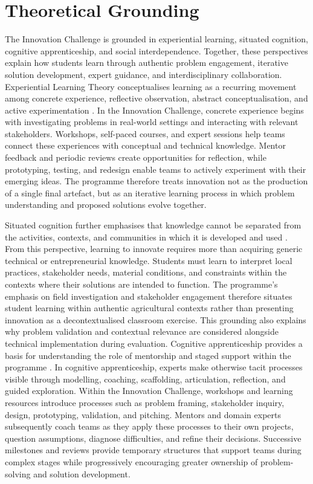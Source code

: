 \documentclass[runningheads]{llncs}
\begin{document}
\section{Theoretical Grounding}

The Innovation Challenge is grounded in experiential learning, situated cognition, cognitive apprenticeship, and social interdependence. Together, these perspectives explain how students learn through authentic problem engagement, iterative solution development, expert guidance, and interdisciplinary collaboration. Experiential Learning Theory conceptualises learning as a recurring movement among concrete experience, reflective observation, abstract conceptualisation, and active experimentation \cite{b14,b15,b16}. In the Innovation Challenge, concrete experience begins with investigating problems in real-world settings and interacting with relevant stakeholders. Workshops, self-paced courses, and expert sessions help teams connect these experiences with conceptual and technical knowledge. Mentor feedback and periodic reviews create opportunities for reflection, while prototyping, testing, and redesign enable teams to actively experiment with their emerging ideas. The programme therefore treats innovation not as the production of a single final artefact, but as an iterative learning process in which problem understanding and proposed solutions evolve together.

Situated cognition further emphasises that knowledge cannot be separated from the activities, contexts, and communities in which it is developed and used \cite{b35}. From this perspective, learning to innovate requires more than acquiring generic technical or entrepreneurial knowledge. Students must learn to interpret local practices, stakeholder needs, material conditions, and constraints within the contexts where their solutions are intended to function. The programme’s emphasis on field investigation and stakeholder engagement therefore situates student learning within authentic agricultural contexts rather than presenting innovation as a decontextualised classroom exercise. This grounding also explains why problem validation and contextual relevance are considered alongside technical implementation during evaluation. Cognitive apprenticeship provides a basis for understanding the role of mentorship and staged support within the programme \cite{b36}. In cognitive apprenticeship, experts make otherwise tacit processes visible through modelling, coaching, scaffolding, articulation, reflection, and guided exploration. Within the Innovation Challenge, workshops and learning resources introduce processes such as problem framing, stakeholder inquiry, design, prototyping, validation, and pitching. Mentors and domain experts subsequently coach teams as they apply these processes to their own projects, question assumptions, diagnose difficulties, and refine their decisions. Successive milestones and reviews provide temporary structures that support teams during complex stages while progressively encouraging greater ownership of problem-solving and solution development.
\end{document}
